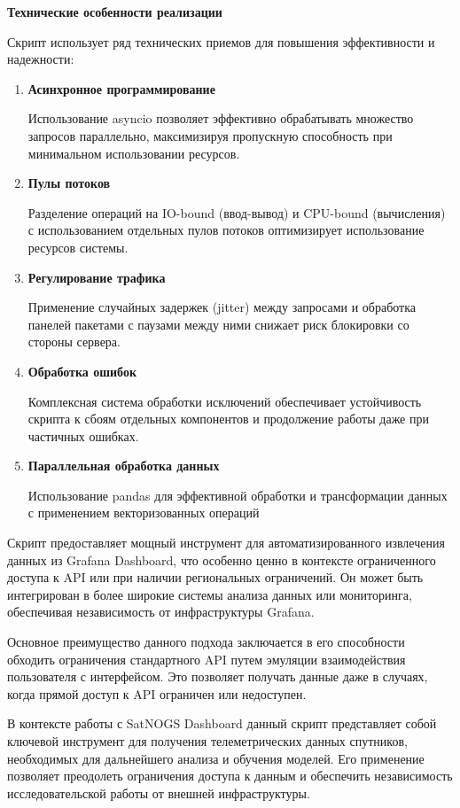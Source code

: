 \textbf{Технические особенности реализации}

Скрипт использует ряд технических приемов для повышения эффективности и надежности:

\begin{enumerate}
	\item \textbf{Асинхронное программирование}

	      Использование asyncio позволяет эффективно обрабатывать множество запросов параллельно, максимизируя пропускную способность при минимальном использовании ресурсов.

	\item \textbf{Пулы потоков}

	      Разделение операций на IO-bound (ввод-вывод) и CPU-bound (вычисления) с использованием отдельных пулов потоков оптимизирует использование ресурсов системы.

	\item \textbf{Регулирование трафика}

	      Применение случайных задержек (jitter) между запросами и обработка панелей пакетами с паузами между ними снижает риск блокировки со стороны сервера.

	\item \textbf{Обработка ошибок}

	      Комплексная система обработки исключений обеспечивает устойчивость скрипта к сбоям отдельных компонентов и продолжение работы даже при частичных ошибках.

	\item \textbf{Параллельная обработка данных}

	      Использование pandas для эффективной обработки и трансформации данных с применением векторизованных операций
\end{enumerate}



Скрипт предоставляет мощный инструмент для автоматизированного извлечения
данных из Grafana Dashboard, что особенно ценно в контексте ограниченного
доступа к API или при наличии региональных ограничений. Он может быть
интегрирован в более широкие системы анализа данных или мониторинга,
обеспечивая независимость от инфраструктуры Grafana.

Основное преимущество данного подхода заключается в его способности обходить
ограничения стандартного API путем эмуляции взаимодействия пользователя с
интерфейсом. Это позволяет получать данные даже в случаях, когда прямой доступ
к API ограничен или недоступен.

В контексте работы с SatNOGS Dashboard данный скрипт представляет собой
ключевой инструмент для получения телеметрических данных спутников, необходимых
для дальнейшего анализа и обучения моделей. Его применение позволяет преодолеть
ограничения доступа к данным и обеспечить независимость исследовательской
работы от внешней инфраструктуры.


